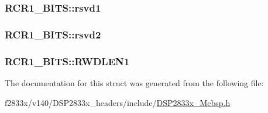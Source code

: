 \subsubsection[{rsvd1}]{ R\+C\+R1\+\_\+\+B\+I\+T\+S\+::rsvd1}\label{struct_r_c_r1___b_i_t_s_a0a7093ae73c7ad21567db066f96c786a}
\hypertarget{struct_r_c_r1___b_i_t_s_ad8d1653bf4581af4d2e0fd907fbaaf91}{}
\subsubsection[{rsvd2}]{ R\+C\+R1\+\_\+\+B\+I\+T\+S\+::rsvd2}\label{struct_r_c_r1___b_i_t_s_ad8d1653bf4581af4d2e0fd907fbaaf91}
\hypertarget{struct_r_c_r1___b_i_t_s_a5997e83558e0dc6eaf5e3c9b90bd6adc}{}
\subsubsection[{R\+W\+D\+L\+E\+N1}]{ R\+C\+R1\+\_\+\+B\+I\+T\+S\+::\+R\+W\+D\+L\+E\+N1}\label{struct_r_c_r1___b_i_t_s_a5997e83558e0dc6eaf5e3c9b90bd6adc}


The documentation for this struct was generated from the following file\+:\begin{DoxyCompactItemize}
\item 
f2833x/v140/\+D\+S\+P2833x\+\_\+headers/include/\hyperlink{_d_s_p2833x___mcbsp_8h}{D\+S\+P2833x\+\_\+\+Mcbsp.\+h}\end{DoxyCompactItemize}
